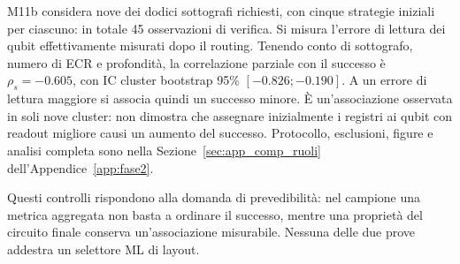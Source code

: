 \begin{onehalfspace}
M11b considera nove dei dodici sottografi richiesti, con cinque strategie iniziali per ciascuno: in totale 45 osservazioni di verifica. Si misura l'errore di lettura dei qubit effettivamente misurati dopo il routing. Tenendo conto di sottografo, numero di ECR e profondità, la correlazione parziale con il successo è $\rho_s=-0.605$, con IC cluster bootstrap 95\% $[-0.826;-0.190]$. A un errore di lettura maggiore si associa quindi un successo minore. È un'associazione osservata in soli nove cluster: non dimostra che assegnare inizialmente i registri ai qubit con readout migliore causi un aumento del successo. Protocollo, esclusioni, figure e analisi completa sono nella Sezione~\ref{sec:app_comp_ruoli} dell'Appendice~\ref{app:fase2}.

Questi controlli rispondono alla domanda di prevedibilità: nel campione
una metrica aggregata non basta a ordinare il successo, mentre una
proprietà del circuito finale conserva un'associazione misurabile.
Nessuna delle due prove addestra un selettore ML di layout.

\end{onehalfspace}
